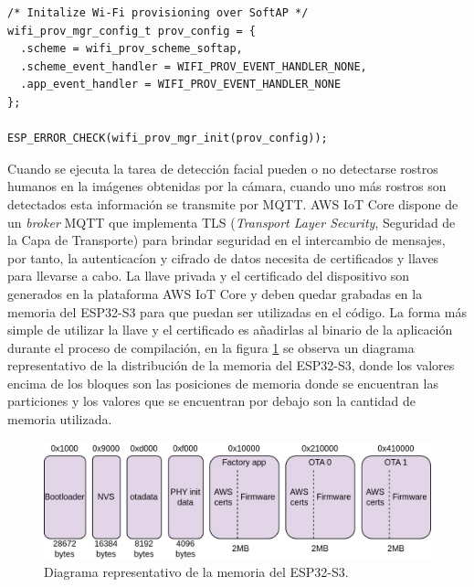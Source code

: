 \begin{lstlisting}[label=cod:mtcnn_struct,caption=Función mtcnn\_run\_onet.]
/* Initalize Wi-Fi provisioning over SoftAP */
wifi_prov_mgr_config_t prov_config = {
  .scheme = wifi_prov_scheme_softap,
  .scheme_event_handler = WIFI_PROV_EVENT_HANDLER_NONE,
  .app_event_handler = WIFI_PROV_EVENT_HANDLER_NONE
};

ESP_ERROR_CHECK(wifi_prov_mgr_init(prov_config));
\end{lstlisting}

Cuando se ejecuta la tarea de detección facial pueden o no detectarse rostros humanos en la imágenes obtenidas por la cámara, cuando uno más rostros son detectados esta información se transmite por MQTT. AWS IoT Core dispone de un \textit{broker} MQTT que implementa TLS (\textit{Transport Layer Security}, Seguridad de la Capa de Transporte) \cite{tls_doc} para brindar seguridad en el intercambio de mensajes, por tanto, la autenticacíon y cifrado de datos necesita de certificados y llaves para llevarse a cabo. La llave privada y el certificado del dispositivo son generados en la plataforma AWS IoT Core y deben quedar grabadas en la memoria del ESP32-S3 para que puedan ser utilizadas en el código. La forma más simple de utilizar la llave y el certificado es añadirlas al binario de la aplicación durante el proceso de compilación, en la figura \ref{fig:fw_parttab1} se observa un diagrama representativo de la distribución de la memoria del ESP32-S3, donde los valores encima de los bloques son las posiciones de memoria donde se encuentran las particiones y los valores que se encuentran por debajo son la cantidad de memoria utilizada.

\begin{figure}[h]
	\centering
	\includegraphics[scale=0.22]{./Figures/fw_parttab1.png}
	\caption{Diagrama representativo de la memoria del ESP32-S3.}
	\label{fig:fw_parttab1}
\end{figure}

